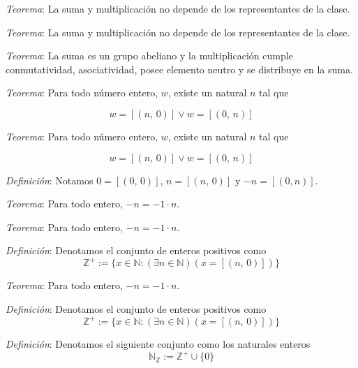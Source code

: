 \documentclass{beamer}
\newcommand{\pair}[2]{(#1,\, #2)}
\begin{document}
  \begin{frame}
    \textit{Teorema}: La suma y multiplicación no depende de los representantes de la clase.
  \end{frame}

  \begin{frame}
    \textit{Teorema}: La suma y multiplicación no depende de los representantes de la clase.
    \newline\newline

    \textit{Teorema}: La suma es un grupo abeliano y la multiplicación cumple
    conmutatividad, asociatividad, posee elemento neutro y se distribuye en la suma.
  \end{frame}

  \begin{frame}
    \textit{Teorema}: Para todo número entero, $w$, existe un natural $n$ tal que

      \[w = [\pair{n}{0}] \lor w = [\pair{0}{n}]\]
  \end{frame}

  \begin{frame}
    \textit{Teorema}: Para todo número entero, $w$, existe un natural $n$ tal que

    \[w = [\pair{n}{0}] \lor w = [\pair{0}{n}]\]
    \newline\newline

    \textit{Definición}: Notamos $0 = [\pair{0}{0}]$, $n = [\pair{n}{0}]$
    y $-n = [(0, n)]$.
  \end{frame}

  \begin{frame}
    \textit{Teorema}: Para todo entero, $-n = -1\cdot n$.
  \end{frame}

 
  \begin{frame}
    \textit{Teorema}: Para todo entero, $-n = -1\cdot n$.
    \newline\newline

    \textit{Definición}: Denotamos el conjunto de enteros positivos como 
    \[ \mathbb{Z}^+ := \{x \in \mathbb{N}: (\exists n\in \mathbb{N})(x = [\pair{n}{0}])\}\]
  \end{frame} 

  \begin{frame}
    \textit{Teorema}: Para todo entero, $-n = -1\cdot n$.
    \newline\newline

    \textit{Definición}: Denotamos el conjunto de enteros positivos como 
    \[ \mathbb{Z}^+ := \{x \in \mathbb{N}: (\exists n\in \mathbb{N})(x = [\pair{n}{0}])\}\]
    \newline\newline

    \textit{Definición}: Denotamos el siguiente conjunto como los naturales enteros
      \[\mathbb{N}_\mathbb{Z} := \mathbb{Z}^+ \cup \{0\}\]
  \end{frame} 
\end{document}
